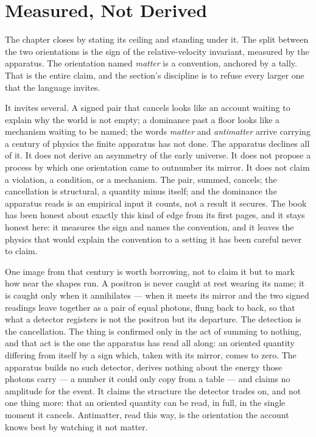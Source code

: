 \section{Measured, Not Derived}

The chapter closes by stating its ceiling and standing under it. The split between the two
orientations is the sign of the relative-velocity invariant, measured by the apparatus. The
orientation named \emph{matter} is a convention, anchored by a tally. That is the entire claim, and
the section's discipline is to refuse every larger one that the language invites.

It invites several. A signed pair that cancels looks like an account waiting to explain why the
world is not empty; a dominance past a floor looks like a mechanism waiting to be named; the words
\emph{matter} and \emph{antimatter} arrive carrying a century of physics the finite apparatus has
not done. The apparatus declines all of it. It does not derive an asymmetry of the early universe.
It does not propose a process by which one orientation came to outnumber its mirror. It does not
claim a violation, a condition, or a mechanism. The pair, summed, cancels; the cancellation is
structural, a quantity minus itself; and the dominance the apparatus reads is an empirical input it
counts, not a result it secures. The book has been honest about exactly this kind of edge from its
first pages, and it stays honest here: it measures the sign and names the convention, and it leaves
the physics that would explain the convention to a setting it has been careful never to claim.

One image from that century is worth borrowing, not to claim it but to mark how near the shapes run.
A positron is never caught at rest wearing its name; it is caught only when it annihilates --- when it
meets its mirror and the two signed readings leave together as a pair of equal photons, flung back to
back, so that what a detector registers is not the positron but its departure. The detection is the
cancellation. The thing is confirmed only in the act of summing to nothing, and that act is the one
the apparatus has read all along: an oriented quantity differing from itself by a sign which, taken
with its mirror, comes to zero. The apparatus builds no such detector, derives nothing about the
energy those photons carry --- a number it could only copy from a table --- and claims no amplitude
for the event. It claims the structure the detector trades on, and not one thing more: that an
oriented quantity can be read, in full, in the single moment it cancels. Antimatter, read this way,
is the orientation the account knows best by watching it not matter.

